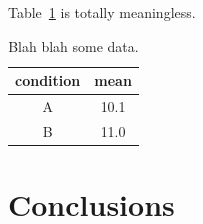 \documentclass[letterpaper,titlepage,12pt]{article}
\begin{document}
Table~\ref{tbl:somedata} is totally meaningless.

\begin{table}[H]
	\centering
	\begin{tabular}{c|c}
		condition &mean\\
		\hline\hline
		A         &10.1\\
		B         &11.0\\
	\end{tabular}
 \caption{Blah blah some data.}
 \label{tbl:somedata}
\end{table}

\lipsum[1-2]

\section{Conclusions}

\lipsum[1-2]

 

\end{document}
